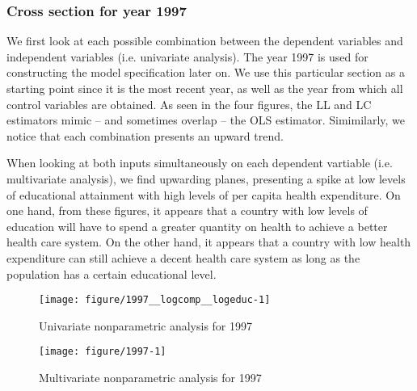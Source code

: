 \documentclass[12pt,a4paper]{article}\usepackage[]{graphicx}\usepackage[]{color}
\newenvironment{knitrout}{}{} %
\begin{document}
\subsubsection{Cross section for year 1997}

We first look at each possible combination between the dependent variables and independent variables (i.e. univariate analysis). The year 1997 is used for constructing the model specification later on. We use this particular section as a starting point since it is the most recent year, as well as the year from which all control variables are obtained. As seen in the four figures, the LL and LC estimators mimic -- and sometimes overlap -- the OLS estimator. Simimilarly, we notice that each combination presents an upward trend.

When looking at both inputs simultaneously on each dependent vartiable (i.e. multivariate analysis), we find upwarding planes, presenting a spike at low levels of educational attainment with high levels of per capita health expenditure. On one hand, from these figures, it appears that a country with low levels of education will have to spend a greater quantity on health to achieve a better health care system. On the other hand, it appears that a country with low health expenditure can still achieve a decent health care system as long as the population has a certain educational level.

\begin{knitrout}
\color{fgcolor}\begin{figure}[htbp]

{\centering \texttt{[image: figure/1997\_\_logcomp\_\_logeduc-1]} 

}

\caption[Univariate nonparametric analysis for 1997]{Univariate nonparametric analysis for 1997}\label{fig:1997, logcomp, logeduc}
\end{figure}


\end{knitrout}

\begin{knitrout}
\color{fgcolor}\begin{figure}[htbp]

{\centering \texttt{[image: figure/1997-1]} 

}

\caption[Multivariate nonparametric analysis for 1997]{Multivariate nonparametric analysis for 1997}\label{fig:1997}
\end{figure}


\end{knitrout}
\end{document}

